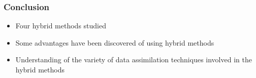 \documentclass{beamer}
\begin{document}
\begin{frame}
	\frametitle{Conclusion}
	
	\begin{itemize}
		\item Four hybrid methods studied
		\item Some advantages have been discovered of using hybrid methods
		\item Understanding of the variety of data assimilation techniques involved in the hybrid methods
		
	\end{itemize}
\end{frame}
\end{document}
